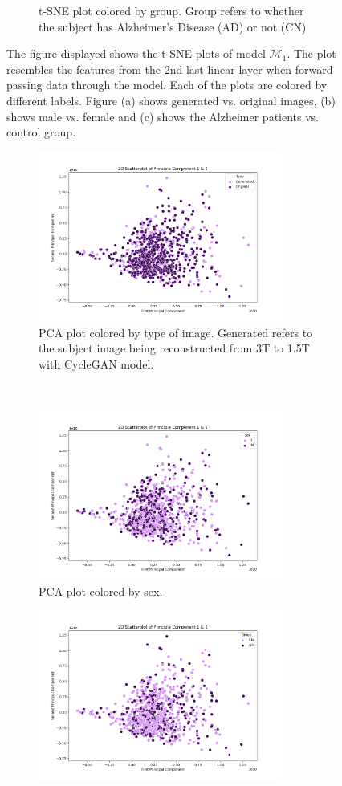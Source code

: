 \documentclass[11pt, fleqn, titlepage]{article}
\newcommand{\1}[1]{\mathds{1}\left[#1\right]}
\begin{document}
\begin{figure}[H]
\begin{subfigure}[t]{0.5\textwidth}
		\caption{t-SNE plot colored by group. Group refers to whether the subject has Alzheimer's Disease (AD) or not (CN)}
	\end{subfigure}
	\caption{The figure displayed shows the t-SNE plots of model $ \mathcal M_1 $. The plot resembles the features from the 2nd last linear layer when forward passing data through the model. Each of the plots are colored by different labels. Figure (a) shows generated vs. original images, (b) shows male vs. female and (c) shows the Alzheimer patients vs. control group. }
	\label{fig:tsne_gen}
\end{figure}


\begin{figure}[H]
	\centering
	\begin{subfigure}[t]{0.59\textwidth}
		\centering
		\includegraphics[height=2.2in]{imgs/classifier/with_generated_imgs_pca_type}%
		\caption{PCA plot colored by type of image. Generated refers to the subject image being reconstructed from 3T to 1.5T with CycleGAN model.}
	\end{subfigure}%
	~
	\begin{subfigure}[t]{0.5\textwidth}
		\centering
		\includegraphics[height=2.2in]{imgs/classifier/with_generated_imgs_pca_sex}%
		\caption{PCA plot colored by sex.}	
	\end{subfigure}
	\begin{subfigure}[t]{0.5\textwidth}
		\centering
		\includegraphics[height=2.2in]{imgs/classifier/with_generated_imgs_pca_group}%

\end{subfigure}
\end{figure}
\end{document}
